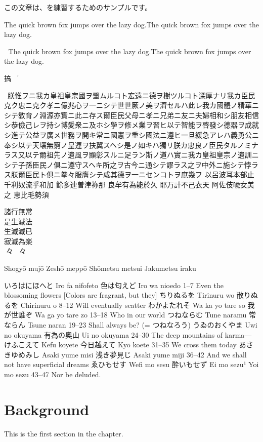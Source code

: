 \documentclass[a5paper, 10pt, openany]{book} %
\begin{document}
この文章は、を練習するためのサンプルです。

The quick brown fox jumps over the lazy dog.The quick brown fox jumps over the lazy dog.

󱜩
The quick brown fox jumps over the lazy dog.The quick brown fox jumps over the lazy dog.

搞$^{'}$
  󱍑  󰼐
󱑡


\ 
朕惟フニ我カ皇祖皇宗國ヲ肇ムルコト宏遠ニ德ヲ樹ツルコト深厚ナリ我カ臣民克ク忠ニ克ク孝ニ億兆心ヲ一ニシテ世世厥ノ美ヲ濟セルハ此レ我カ國體ノ精華ニシテ敎育ノ淵源亦實ニ此ニ存ス爾臣民父母ニ孝ニ兄弟ニ友ニ夫婦相和シ朋友相信シ恭儉己レヲ持シ博愛衆ニ及ホシ學ヲ修メ業ヲ習ヒ以テ智能ヲ啓發シ德器ヲ成就シ進テ公益ヲ廣メ世務ヲ開キ常ニ國憲ヲ重シ國法ニ遵ヒ一旦緩急アレハ義勇公ニ奉シ以テ天壤無窮ノ皇運ヲ扶翼スヘシ是ノ如キハ獨リ朕カ忠良ノ臣民タルノミナラス又以テ爾祖先ノ遺風ヲ顯彰スルニ足ラン斯ノ道ハ實ニ我カ皇祖皇宗ノ遺訓ニシテ子孫臣民ノ俱ニ遵守スヘキ所之ヲ古今ニ通シテ謬ラス之ヲ中外ニ施シテ悖ラス朕爾臣民ト俱ニ拳々服膺シテ咸其德ヲ一ニセンコトヲ庶幾フ
以呂波耳本部止
千利奴流乎和加
餘多連曽津祢那
良牟有為能於久
耶万計不己衣天
阿佐伎喩女美之
恵比毛勢須


諸行無常\\
是生滅法\\
生滅滅已\\
寂滅為楽\\

々々


Shogyō mujō
Zeshō meppō
Shōmetsu metsui
Jakumetsu iraku

いろはにほへと	Iro fa nifofeto	色は匂えど	Iro wa nioedo	1–7	Even the blossoming flowers [Colors are fragrant, but they]
ちりぬるを	Tirinuru wo	散りぬるを	Chirinuru o	8–12	Will eventually scatter
わかよたれそ	Wa ka yo tare so	我が世誰ぞ	Wa ga yo tare zo	13–18	Who in our world
つねならむ	Tune naramu	常ならん	Tsune naran	19–23	Shall always be? (= つねなろう)
うゐのおくやま	Uwi no okuyama	有為の奥山	Ui no okuyama	24–30	The deep mountains of karma—
けふこえて	Kefu koyete	今日越えて	Kyō koete	31–35	We cross them today
あさきゆめみし	Asaki yume misi	浅き夢見じ	Asaki yume miji	36–42	And we shall not have superficial dreams
ゑひもせす	Wefi mo sesu	酔いもせず	Ei mo sezu¹
Yoi mo sezu	43–47	Nor be deluded.


\section{Background}
This is the first section in the chapter.
\end{document}

